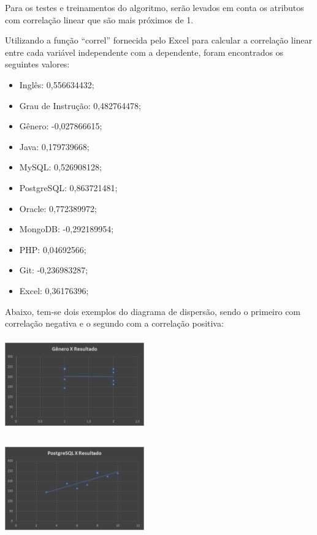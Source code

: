 \documentclass[conference]{IEEEtran}
\begin{document}
Para os testes e treinamentos do algoritmo, serão levados em conta os atributos com correlação linear que são mais próximos de 1.

Utilizando a função “correl” fornecida pelo Excel para calcular a correlação linear entre cada variável independente com a dependente, foram encontrados os seguintes valores:

\begin{itemize}
\item Inglês: 0,556634432;
\item Grau de Instrução: 0,482764478;
\item Gênero: -0,027866615;
\item Java: 0,179739668;
\item MySQL: 0,526908128;
\item PostgreSQL: 0,863721481;
\item Oracle: 0,772389972;
\item MongoDB: -0,292189954;
\item PHP: 0,04692566;
\item Git: -0,236983287;
\item Excel: 0,36176396;
\end{itemize}

Abaixo, tem-se dois exemplos do diagrama de dispersão, sendo o primeiro com correlação negativa e o segundo com a correlação positiva:

\vspace{7mm}
\centerline{\includegraphics[width=60mm,height=40mm,keepaspectratio]{Grafico1.png}}
\vspace{7mm}

\vspace{7mm}
\centerline{\includegraphics[width=60mm,height=40mm,keepaspectratio]{Grafico2.png}}
\vspace{7mm}
\end{document}
